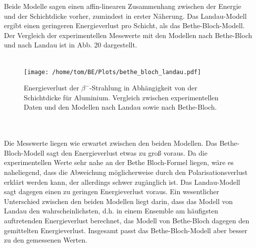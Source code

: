 \documentclass[german,  %
parskip=full,  %
]{scrartcl}
\begin{document}
Beide Modelle sagen einen affin-linearen Zusammenhang zwischen der Energie und der Schichtdicke vorher, zumindest in erster Näherung. Das Landau-Modell ergibt einen geringeren Energieverlust pro Schicht, als das Bethe-Bloch-Modell. Der Vergleich der experimentellen Messwerte mit den Modellen nach Bethe-Bloch und nach Landau ist in Abb. 20 dargestellt. \\\\
\begin{figure}[h!]\centering
\texttt{[image: /home/tom/BE/Plots/bethe\_bloch\_landau.pdf]}
\caption{Energieverlust der \(\beta^-\)-Strahlung in Abhängigkeit von der Schichtdicke für Aluminium. Vergleich zwischen experimentellen Daten und den Modellen nach Landau sowie nach Bethe-Bloch.}
\end{figure} \\\\
Die Messwerte liegen wie erwartet zwischen den beiden Modellen. Das Bethe-Bloch-Modell sagt den Energieverlust etwas zu groß voraus. Da die experimentellen Werte sehr nahe an der Bethe Bloch-Formel liegen, wäre es naheliegend, dass die Abweichung möglicherweise durch den Polarisationsverlust erklärt werden kann, der allerdings schwer zugänglich ist. Das Landau-Modell sagt dagegen einen zu geringen Energieverlust voraus. Ein wesentlicher Unterschied zwischen den beiden Modellen liegt darin, dass das Modell von Landau den wahrscheinlichsten, d.h. in einem Ensemble am häufigsten auftretenden Energieverlust berechnet, das Modell von Bethe-Bloch dagegen den gemittelten Energieverlust. Insgesamt passt das Bethe-Bloch-Modell aber besser zu den gemessenen Werten.
\end{document}
